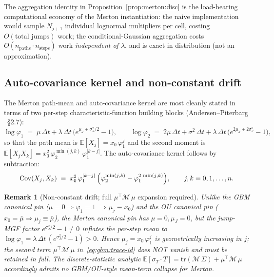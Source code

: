 \documentclass[11pt,letterpaper]{article}
\newtheorem{remark}{Remark}[section]
\newcommand{\E}{\mathbb{E}}
\newcommand{\Cov}{\text{Cov}}
\newcommand{\sigmaT}{\sigma_{T}}
\newcommand{\centerProj}{\mathcal{M}}
\begin{document}
The aggregation identity in Proposition~\ref{prop:merton:disc} is the
load-bearing computational economy of the Merton instantiation: the naive
implementation would sample $N_{j+1}$ individual lognormal multipliers per
cell, costing $O(\text{total jumps})$ work; the conditional-Gaussian
aggregation costs $O(n_{\text{paths}} \cdot n_{\text{steps}})$ work
\emph{independent of $\lambda$}, and is exact in distribution (not an
approximation).

\subsection{Auto-covariance kernel and non-constant drift}
\label{sec:merton:autocov}

The Merton path-mean and auto-covariance kernel are most cleanly stated in
terms of two per-step characteristic-function building blocks
(Andersen--Piterbarg \cite{andersen-piterbarg-2010}~\S2.7):
\begin{equation}
    \log\varphi_{1}
    \;=\; \mu\,\Delta t
        + \lambda\,\Delta t\,\bigl(e^{\mu_{J} + \sigma_{J}^{2}/2} - 1\bigr),
    \qquad
    \log\varphi_{2}
    \;=\; 2\mu\,\Delta t + \sigma^{2}\,\Delta t
        + \lambda\,\Delta t\,\bigl(e^{2\mu_{J} + 2\sigma_{J}^{2}} - 1\bigr),
    \label{eq:merton:phi}
\end{equation}
so that the path mean is $\E[X_{j}] = x_{0}\,\varphi_{1}^{j}$ and the
second moment is $\E[X_{j} X_{k}] = x_{0}^{2}\,\varphi_{2}^{\min(j,k)}\,
\varphi_{1}^{|k-j|}$. The auto-covariance kernel follows by subtraction:
\begin{equation}
    \Cov(X_{j}, X_{k})
    \;=\;
    x_{0}^{2}\,\varphi_{1}^{|k-j|}\,
    \Bigl(\varphi_{2}^{\min(j, k)} - \varphi_{1}^{2\,\min(j, k)}\Bigr),
    \qquad j, k = 0, 1, \dots, n.
    \label{eq:merton:cov}
\end{equation}

\begin{remark}[Non-constant drift; full $\mu^{\top}\centerProj\,\mu$ expansion required]
\label{rem:merton:drift}
Unlike the GBM canonical pin ($\mu = 0 \Rightarrow \varphi_{1} = 1$
$\Rightarrow \mu_{j} \equiv x_{0}$) and the OU canonical pin
($x_{0} = \bar\mu \Rightarrow \mu_{j} \equiv \bar\mu$), the Merton
canonical pin has $\mu = 0, \mu_{J} = 0$, but the jump-MGF factor
$e^{\sigma_{J}^{2}/2} - 1 \neq 0$ inflates the per-step mean to
$\log\varphi_{1} = \lambda\,\Delta t\,(e^{\sigma_{J}^{2}/2} - 1) > 0$.
Hence $\mu_{j} = x_{0}\,\varphi_{1}^{j}$ is geometrically increasing in
$j$; the second term $\mu^{\top}\centerProj\,\mu$
in~\eqref{eq:gbm:trace-id} does NOT vanish and must be retained in full.
The discrete-statistic analytic
$\E[\sigmaT \cdot T] = \mathrm{tr}(\centerProj\,\Sigma) +
\mu^{\top}\centerProj\,\mu$ accordingly admits no GBM/OU-style mean-term
collapse for Merton.
\end{remark}
\end{document}
